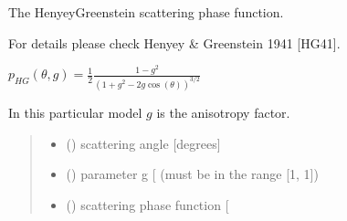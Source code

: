 \documentclass[letterpaper,10pt,english]{sphinxmanual}
\begin{document}
\begin{fulllineitems}
\label{\detokenize{06_anisotropy_factor:skinoptics.anisotropy_factor.ptheta_HG}}
\pysigstartsignatures
{}
\pysigstopsignatures
\begin{DUlineblock}{0em}
\item[] The Henyey\sphinxhyphen{}Greenstein scattering phase function.
\item[] For details please check Henyey \& Greenstein 1941 {[}HG41{]}.
\end{DUlineblock}

\sphinxAtStartPar
\(p_{HG}(\theta, g) = \frac{1}{2}\frac{1 - g^2}{(1 + g^2 - 2g \cos(\theta))^{3/2}}\)

\sphinxAtStartPar
In this particular model \(g\) is the anisotropy factor.
\begin{quote}\begin{description}
\begin{itemize}
\item {} 
\sphinxAtStartPar
{} () \textendash{} scattering angle {[}degrees{]}

\item {} 
\sphinxAtStartPar
{} () \textendash{} parameter g {[}\sphinxhyphen{}{]} (must be in the range {[}\sphinxhyphen{}1, 1{]})

\end{itemize}

\sphinxAtStartPar
\begin{itemize}
\item {} 
\sphinxAtStartPar
{} () \textendash{} scattering phase function {[}\sphinxhyphen{}{]}

\end{itemize}


\end{description}\end{quote}

\end{fulllineitems}
\end{document}
